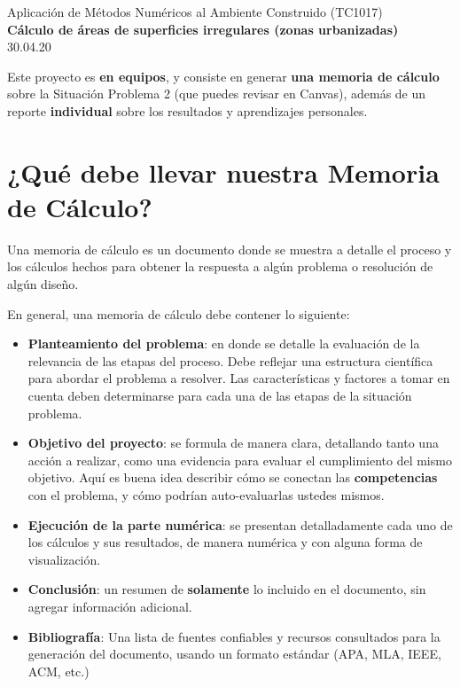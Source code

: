 \documentclass[]{article}
\theoremstyle{definition}
\begin{document}
\begin{center}
{\huge Aplicación de Métodos Numéricos al Ambiente Construido (TC1017)}\\[1.5ex]
{\large \textbf{Cálculo de áreas de superficies irregulares (zonas urbanizadas)}\\[1.5ex] %
30.04.20} %
\end{center}

\vspace{0.2 cm}

{%
\small
Este proyecto es \textbf{en equipos}, y consiste en generar \textbf{una memoria de cálculo} sobre la Situación Problema 2 (que puedes revisar en Canvas), además de un reporte \textbf{individual} sobre los resultados y aprendizajes personales.
}

\bigskip

\section{¿Qué debe llevar nuestra Memoria de Cálculo?}

Una memoria de cálculo es un documento donde se muestra a detalle el proceso y los cálculos hechos para obtener la respuesta a algún problema o resolución de algún diseño.

\bigskip

En general, una memoria de cálculo debe contener lo siguiente:

\begin{itemize}
    \item \textbf{Planteamiento del problema}: en donde se detalle la evaluación de la relevancia de las etapas del proceso. Debe reflejar una estructura científica para abordar el problema a resolver. Las características y factores a tomar en cuenta deben determinarse para cada una de las etapas de la situación problema.
    \item \textbf{Objetivo del proyecto}: se formula de manera clara, detallando tanto una acción a realizar, como una evidencia para evaluar el cumplimiento del mismo objetivo. Aquí es buena idea describir cómo se conectan las \textbf{competencias} con el problema, y cómo podrían auto-evaluarlas ustedes mismos.
    \item \textbf{Ejecución de la parte numérica}: se presentan detalladamente cada uno de los cálculos y sus resultados, de manera numérica y con alguna forma de visualización.
    \item \textbf{Conclusión}: un resumen de \textbf{solamente} lo incluido en el documento, sin agregar información adicional.
    \item \textbf{Bibliografía}: Una lista de fuentes confiables y recursos consultados para la generación del documento, usando un formato estándar (APA, MLA, IEEE, ACM, etc.)
\end{itemize}
\end{document}
